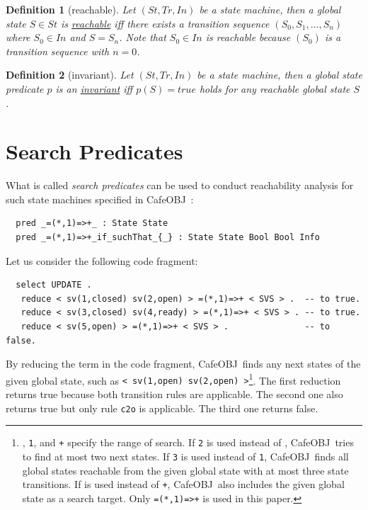 \documentclass[12pt]{report}
\newtheorem{definition}{Definition}
\newcommand{\stt}[1]{{\small{\tt {#1}}}}
\newcommand{\ul}{\underline}
\newcommand{\cafeobj}{{\sf CafeOBJ}~}
\begin{document}
\begin{definition}[reachable]
  Let $(S\!t,T\!r,In)$ be a state machine, then a global state $S\in S\!t$
  is \ul{reachable} iff there exists a transition sequence
  $(S\!_0,S\!_1,\dots,S\!_n)$ where $S\!_0\in In$ and $S=S\!_n$. Note that $S\!_0\in
  In$ is reachable because $(S\!_0)$ is a transition sequence with $n=0$.
\end{definition}
\begin{definition}[invariant]
  Let $(S\!t,T\!r,In)$ be a state machine, then a global state predicate
  $p$ is an \ul{invariant} iff $p(S)=true$ holds for any reachable
  global state $S$.
\end{definition}

\section{Search Predicates}
\label{sec:searchpredicate}
What is called {\it search predicates} can be used to conduct
reachability analysis for such state machines specified in
\cafeobj:
\small
\begin{verbatim}
  pred _=(*,1)=>+_ : State State
  pred _=(*,1)=>+_if_suchThat_{_} : State State Bool Bool Info
\end{verbatim}
\normalsize

Let us consider the following code fragment:
\small
\begin{verbatim}
  select UPDATE .
   reduce < sv(1,closed) sv(2,open) > =(*,1)=>+ < SVS > .  -- to true.
   reduce < sv(3,closed) sv(4,ready) > =(*,1)=>+ < SVS > . -- to true.
   reduce < sv(5,open) > =(*,1)=>+ < SVS > .               -- to false.
\end{verbatim}
\normalsize
By reducing the term in the code fragment, \cafeobj finds any next
states of the given global state, such as
\stt{<~sv(1,open)~sv(2,open)~>}\footnote{{\tt *}, {\tt 1}, and {\tt +}
  specify the range of search. If {\tt 2} is used instead of {\tt *},
  \cafeobj tries to find at most two next states. If {\tt 3} is used
  instead of {\tt 1}, \cafeobj finds all global states reachable from the
  given global state with at most three state transitions. If {\tt *} is used
  instead of {\tt +}, \cafeobj also includes the given global state as a
  search target.  Only \stt{=(*,1)=>+} is used in this paper.}.  The
first reduction returns true because both transition rules are
applicable.  The second one also returns true but only rule {\tt c2o}
is applicable. The third one returns false.
\end{document}
